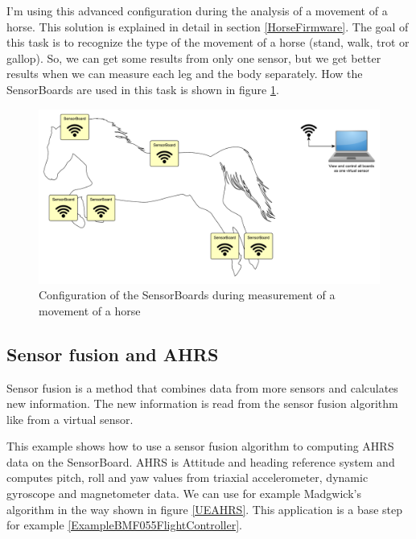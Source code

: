 I'm using this advanced configuration during the analysis of a movement of a horse. This solution is explained in detail in section \ref{HorseFirmware}. The goal of this task is to recognize the type of the movement of a horse (stand, walk, trot or gallop). So, we can get some results from only one sensor, but we get better results when we can measure each leg and the body separately. How the SensorBoards are used in this task is shown in figure \ref{UELoggingHorse}.

\begin{figure}[H]
	\centering
	\label{UELoggingHorse}
	\caption{Configuration of the SensorBoards during measurement of a movement of a horse}
	\includegraphics[width=16cm]{img/UsageExamplesLoggerHorse.pdf}
\end{figure}

\subsection{Sensor fusion and AHRS}
\label{ExampleAHRS}
Sensor fusion is a method that combines data from more sensors and calculates new information. The new information is read from the sensor fusion algorithm like from a virtual sensor. \cite{SensorFusion}

This example shows how to use a sensor fusion algorithm to computing AHRS data on the SensorBoard. AHRS is Attitude and heading reference system and computes pitch, roll and yaw values from triaxial accelerometer, dynamic gyroscope and magnetometer data. We can use for example Madgwick's algorithm \cite{MadgwickAHRS} in the way shown in figure \ref{UEAHRS}. This application is a base step for example \ref{ExampleBMF055FlightController}.

